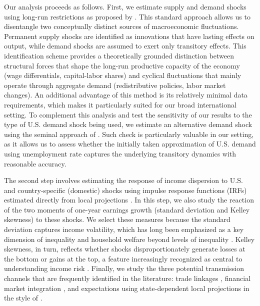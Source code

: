 \documentclass[12pt, a4paper]{article}
\begin{document}
Our analysis proceeds as follows. First, we estimate supply and demand shocks using long-run restrictions as proposed by \textcite{blanchard1989dynamic}. This standard approach allows us to disentangle two conceptually distinct sources of macroeconomic fluctuations. Permanent supply shocks are identified as innovations that have lasting effects on output, while demand shocks are assumed to exert only transitory effects. This identification scheme provides a theoretically grounded distinction between structural forces that shape the long-run productive capacity of the economy (wage differentials, capital-labor shares) and cyclical fluctuations that mainly operate through aggregate demand (redistributive policies, labor market changes). An additional advantage of this method is its relatively minimal data requirements, which makes it particularly suited for our broad international setting. To complement this analysis and test the sensitivity of our results to the type of U.S. demand shock being used, we estimate an alternative demand shock using the seminal approach of \textcite{bayoumi1992shocking}. Such check is particularly valuable in our setting, as it allows us to assess whether the initially taken approximation of U.S. demand using unemployment rate captures the underlying transitory dynamics with reasonable accuracy. 

The second step involves estimating the response of income dispersion to U.S. and country-specific (domestic) shocks using impulse response functions (IRFs) estimated directly from local projections \parencite{jorda2005estimation, jorda2024local}. In this step, we also study the reaction of the two moments of one-year earnings growth (standard deviation and Kelley skewness) to these shocks. We select these measures because the standard deviation captures income volatility, which has long been emphasized as a key dimension of inequality and household welfare beyond levels of inequality \parencite{gottschalk1994growth, dynan2012evolution}. Kelley skewness, in turn, reflects whether shocks disproportionately generate losses at the bottom or gains at the top, a feature increasingly recognized as central to understanding income risk \parencite{guvenen2014nature, busch2018asymmetric, hoffmann2019employment}. Finally, we study the three potential transmission channels that are frequently identified in the literature: trade linkages \parencite{corsetti2011multilateral}, financial market integration \parencite{faccini2016international}, and expectations \parencite{klein2021real} using state-dependent local projections in the style of \textcite{auerbach2013output}.
\end{document}

